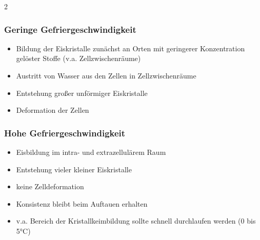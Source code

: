 \documentclass[a4paper,10pt]{article}
\begin{document}
\ppbig
\begin{multicols}{2}
\subsubsection*{Geringe Gefriergeschwindigkeit}
\begin{itemize}
\item Bildung der Eiskristalle zunächst an Orten mit geringerer Konzentration gelöster Stoffe (v.a. Zellzwischenräume)
\item Austritt von Wasser aus den Zellen in Zellzwischenräume
\item Entstehung großer unförmiger Eiskristalle
\item Deformation der Zellen
\end{itemize}

\columnbreak
\subsubsection*{Hohe Gefriergeschwindigkeit}
\begin{itemize}
\item Eisbildung im intra- und extrazellulärem Raum
\item Entstehung vieler kleiner Eiskristalle
\item keine Zelldeformation
\item Konsistenz bleibt beim Auftauen erhalten
\item v.a. Bereich der Kristallkeimbildung sollte schnell durchlaufen werden (0 bis 5°C)
\end{itemize}
\end{multicols}
\end{document}
